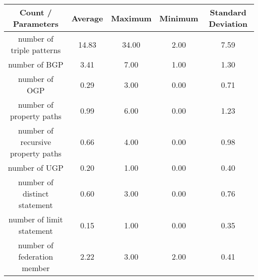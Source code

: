 \begin{center}
    \begin{tabular}{|*{5}{c|}}
     \hline
     Count / Parameters & Average & Maximum & Minimum & Standard Deviation \\ 
     \hline \hline
     number of triple patterns & 14.83 & 34.00 & 2.00 & 7.59 \\ 
     \hline
     number of BGP & 3.41 & 7.00 & 1.00 & 1.30 \\ 
     \hline
     number of OGP & 0.29 & 3.00 & 0.00 & 0.71 \\ 
     \hline
     number of property paths & 0.99 & 6.00 & 0.00 & 1.23 \\ 
     \hline
     number of recursive property paths & 0.66 & 4.00 & 0.00 & 0.98 \\ 
     \hline
     number of UGP & 0.20 & 1.00 & 0.00 & 0.40 \\ 
     \hline
     number of distinct statement & 0.60 & 3.00 & 0.00 & 0.76 \\ 
     \hline
     number of limit statement & 0.15 & 1.00 & 0.00 & 0.35 \\  
     \hline
     number of federation member & 2.22 & 3.00 & 2.00 & 0.41 \\  
     \hline
    \end{tabular}
\end{center}